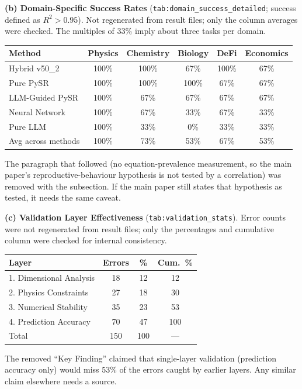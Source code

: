 \documentclass[11pt]{article}
\newcommand{\Rsq}{R^{2}}
\begin{document}
\textbf{(b) Domain-Specific Success Rates} (\texttt{tab:domain\_success\_detailed}; success defined as $\Rsq>0.95$). Not
regenerated from result files; only the column averages were checked. The multiples of $33\%$ imply about three tasks per domain.
\begin{center}\small
\begin{tabular}{lccccc}
\toprule
Method & Physics & Chemistry & Biology & DeFi & Economics \\
\midrule
Hybrid v50\_2 & 100\% & 100\% & 67\% & 100\% & 67\% \\
Pure PySR & 100\% & 100\% & 100\% & 67\% & 67\% \\
LLM-Guided PySR & 100\% & 67\% & 67\% & 67\% & 67\% \\
Neural Network & 100\% & 67\% & 33\% & 67\% & 33\% \\
Pure LLM & 100\% & 33\% & 0\% & 33\% & 33\% \\
Avg across methods & 100\% & 73\% & 53\% & 67\% & 53\% \\
\bottomrule
\end{tabular}
\end{center}
The paragraph that followed (no equation-prevalence measurement, so the main paper's reproductive-behaviour hypothesis is
not tested by a correlation) was removed with the subsection. If the main paper still states that hypothesis as tested,
it needs the same caveat.

\textbf{(c) Validation Layer Effectiveness} (\texttt{tab:validation\_stats}). Error counts were not regenerated from
result files; only the percentages and cumulative column were checked for internal consistency.
\begin{center}\small
\begin{tabular}{lccc}
\toprule
Layer & Errors & \% & Cum.\ \% \\
\midrule
1. Dimensional Analysis & 18 & 12 & 12 \\
2. Physics Constraints & 27 & 18 & 30 \\
3. Numerical Stability & 35 & 23 & 53 \\
4. Prediction Accuracy & 70 & 47 & 100 \\
Total & 150 & 100 & --- \\
\bottomrule
\end{tabular}
\end{center}
The removed ``Key Finding'' claimed that single-layer validation (prediction accuracy only) would miss $53\%$ of the errors
caught by earlier layers. Any similar claim elsewhere needs a source.
\end{document}
